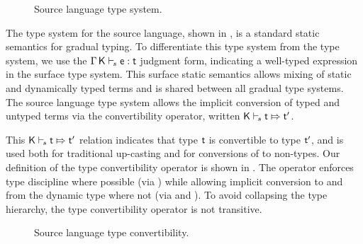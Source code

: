 \documentclass[a4paper,USenglish]{tex/lipics-v2016}
\begin{document}
\begin{figure}[!h]
\begin{mathpar}
          \end{mathpar}
  
  \vspace{2mm}
  
  \hrulefill
  \caption{Source language type system.}\label{fig:slts}
\end{figure}

The type system for the source language, shown in , is a
standard static semantics for gradual typing. To differentiate this type
system from the \kafka type system, we use the $\EnvTypeS \Env\K\e\t$ judgment
form, indicating a well-typed expression in the surface type system. This
surface static semantics allows mixing of static and dynamically typed terms
and is shared between all gradual type systems. The source language type
system allows the implicit conversion of typed and untyped terms via the
convertibility operator, written $\ConvertE\K{s}{\t}{\tp}$.

This $\ConvertE\K{s}{\t}{\tp}$ relation indicates that type $\t$ is
convertible to type $\tp$, and is used both for traditional up-casting and for
conversions of \any to non-\any types. Our definition of the type
convertibility operator is shown in . The operator
enforces type discipline where possible (via ) while
allowing implicit conversion to and from the dynamic type where not (via
 and ). To avoid collapsing the type
hierarchy, the type convertibility operator is not transitive.

\begin{figure}[!h]
  \hrulefill  \small  \vspace{-3mm}
  
  \begin{mathpar}
    
    
  \end{mathpar}
  \vspace{-8mm}
  
  \hrulefill
  \caption{Source language type convertibility.}\label{fig:tyconvert}
\end{figure}
\end{document}
